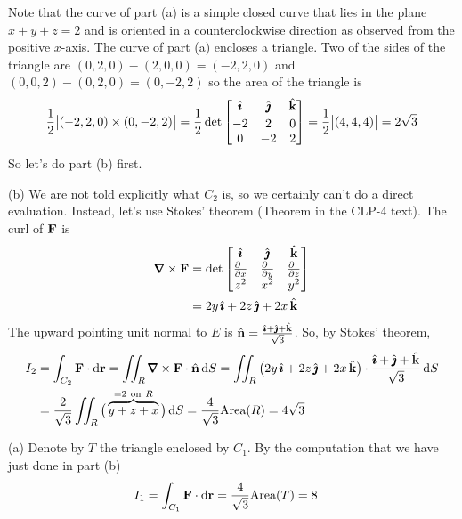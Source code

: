 \begin{solution} 
Note that the curve of part (a) is a simple closed curve
that lies in the plane $x+y+z=2$ and is oriented in a 
counterclockwise direction as observed from the positive $x$-axis.
The curve of part (a) encloses a triangle. 
Two of the sides of the triangle
are $(0,2,0)-(2,0,0)=(-2,2,0)$ and  $(0,0,2)-(0,2,0)=(0,-2,2)$ so the
area of the triangle is
\begin{equation*}
\frac{1}{2}\big|(-2,2,0)\times (0,-2,2)\big|
=\frac{1}{2} \det\left[\begin{matrix}\hat{\pmb{\imath}}&\hat{\pmb{\jmath}}&\hat{\mathbf{k}}\\[0.03in] 
     -2& 2& 0 \\  0 & -2 & 2 \end{matrix}\right]
=\frac{1}{2}\big|(4,4,4)\big|
=2\sqrt{3}
\end{equation*}
So let's do part (b) first.

(b) We are not told explicitly what $C_2$ is, so we certainly can't
do a direct evaluation. Instead, let's use Stokes' theorem
(Theorem  in the CLP-4 text). The curl of $\mathbf{F}$ is
\begin{align*}
\vnabla\times\vF
&=\det\left[\begin{matrix}
\hi &\hj &\hk \\
\tfrac{\partial\hfill}{\partial x} & \tfrac{\partial\hfill}{\partial y} & 
                \tfrac{\partial\hfill}{\partial z} \\
z^2 & x^2 & y^2
\end{matrix}
\right] \\
&= 2y\,\hi 
    +2z\,\hj 
    +2x\,\hk  
\end{align*}
The upward pointing unit normal to $E$ is $\hat{\mathbf{n}}=\frac{\hat{\pmb{\imath}}+\hat{\pmb{\jmath}}+\hat{\mathbf{k}}}{\sqrt{3}}$.
So, by Stokes' theorem,
\begin{align*}
I_2 &= \int_{C_2}\vF\cdot\dee{\vr}
    =\dblInt_R \vnabla\times\vF\cdot\hn\,\dee{S}
    =\dblInt_R \big(2y\,\hi +2z\,\hj +2x\,\hk\big)\cdot
               \frac{\hi+\hj+\hk}{\sqrt{3}}\,\dee{S} \\
&=\frac{2}{\sqrt{3}}\dblInt_R \big(\overbrace{y + z + x}^
                             {=2\ {\rm on}\ R}\big)\,\dee{S}
=\frac{4}{\sqrt{3}}\text{Area}(R)
=4\sqrt{3}
\end{align*}

(a) Denote by $T$ the triangle enclosed by $C_1$. By the
computation that we have just done in part (b) 
\begin{align*}
I_1 &= \int_{C_1}\mathbf{F}\cdot\mathrm{d}\mathbf{r}
     =\frac{4}{\sqrt{3}}\text{Area}(T)
     =8
\end{align*}
\end{solution}

